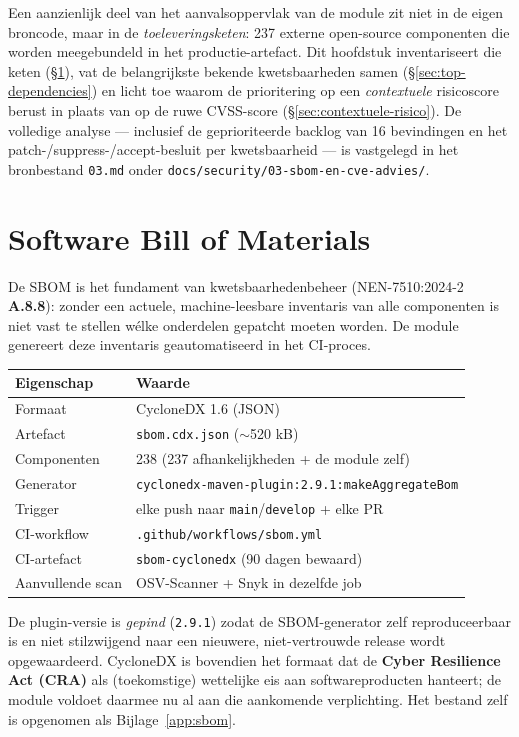 \documentclass[12pt, a4paper]{report}
\begin{document}
Een aanzienlijk deel van het aanvalsoppervlak van de module zit niet in de eigen
broncode, maar in de \emph{toeleveringsketen}: 237 externe open-source componenten
die worden meegebundeld in het productie-artefact. Dit hoofdstuk inventariseert
die keten (\S\ref{sec:sbom}), vat de belangrijkste bekende kwetsbaarheden samen
(\S\ref{sec:top-dependencies}) en licht toe waarom de prioritering op een
\emph{contextuele} risicoscore berust in plaats van op de ruwe CVSS-score
(\S\ref{sec:contextuele-risico}). De volledige analyse --- inclusief de
geprioriteerde backlog van 16 bevindingen en het patch-/suppress-/accept-besluit
per kwetsbaarheid --- is vastgelegd in het bronbestand \texttt{03.md} onder
\texttt{docs/security/03-sbom-en-cve-advies/}.

\section{Software Bill of Materials}
\label{sec:sbom}

De SBOM is het fundament van kwetsbaarhedenbeheer (NEN-7510:2024-2 \textbf{A.8.8}):
zonder een actuele, machine-leesbare inventaris van alle componenten is niet vast
te stellen wélke onderdelen gepatcht moeten worden. De module genereert deze
inventaris geautomatiseerd in het CI-proces.

\begin{tabular}{@{}ll}
    \toprule
    \textbf{Eigenschap} & \textbf{Waarde} \\
    \midrule
    Formaat          & CycloneDX 1.6 (JSON) \\
    Artefact         & \texttt{sbom.cdx.json} ($\sim$520 kB) \\
    Componenten      & 238 (237 afhankelijkheden + de module zelf) \\
    Generator        & \texttt{cyclonedx-maven-plugin:2.9.1:makeAggregateBom} \\
    Trigger          & elke push naar \texttt{main}/\texttt{develop} + elke PR \\
    CI-workflow      & \texttt{.github/workflows/sbom.yml} \\
    CI-artefact      & \texttt{sbom-cyclonedx} (90 dagen bewaard) \\
    Aanvullende scan & OSV-Scanner + Snyk in dezelfde job \\
    \bottomrule
\end{tabular}

De plugin-versie is \emph{gepind} (\texttt{2.9.1}) zodat de SBOM-generator zelf
reproduceerbaar is en niet stilzwijgend naar een nieuwere, niet-vertrouwde release
wordt opgewaardeerd. CycloneDX is bovendien het formaat dat de \textbf{Cyber
Resilience Act (CRA)} als (toekomstige) wettelijke eis aan softwareproducten
hanteert; de module voldoet daarmee nu al aan die aankomende verplichting. Het
bestand zelf is opgenomen als Bijlage~\ref{app:sbom}.
\end{document}
